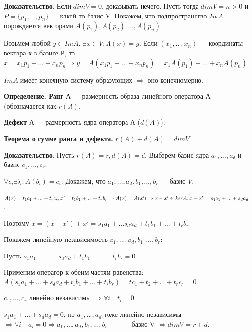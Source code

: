 \documentclass[a4paper]{article}
\begin{document}
    \begin{hproof}
        \textbf{Доказательство.} Если $dimV = 0$, доказывать нечего.
        Пусть тогда $dimV = n>0$ и $P = \{p_1, ..., p_n\}$ --- какой-то базис V. Покажем, что подпространство $ImA$ порождается векторами $A(p_1), A(p_2), ..., A(p_n)$

        Возьмём любой $y \in ImA$. $\exists x \in V: A(x) = y$. Если $(x_1, ..., x_n)$ --- координаты вектора $х$ в базисе $Р$, то $x = x_1p_1 + ... + x_np_n \Rightarrow y = A(x_1p_1 + ... + x_np_n) = x_1A(p_1) + ... + x_nA(p_n)$

        $ImA$ имеет конечную систему образующих $\Rightarrow$ оно конечномерно.
    \end{hproof}

    \textbf{Определение. Ранг} $А$ --- размерность образа линейного оператора $А$ (обозначается как $r(A)$.

    \textbf{Дефект} $А$ --- размерность ядра оператора А ($d(A)$).

    \begin{htheorem}
        \textbf{Теорема о сумме ранга и дефекта.} $r(A) + d(A) = dimV$
    \end{htheorem}

    \begin{hproof}
        \textbf{Доказательство.} Пусть $r(A) = r, d(A) = d$. Выберем базис ядра $a_1, ..., a_d$ и базис $c_1, ..., c_r$.

        $\forall c_i \exists b_i: A(b_i) = c_i$. Докажем, что $a_1, ..., a_d, b_1, ..., b_r$ --- базис $V$.

        $A(x) = t_1c_1 + ... + t_rc_r, x' = t_1b_1 + ... + t_rb_r\\ \Rightarrow A(x) = A(x') \Rightarrow x-x' \in kerA, x-x' = s_1a_1 + ... + s_da_d$.

        Поэтому $x=(x-x')+x' = s_1a_1 + ... s_da_d + t_1b_1 + ... + t_rb_r$

        Покажем линейную независимость $a_1, ..., a_d, b_1, ..., b_r$:

        Пусть $s_1a_1 + ... + s_da_d + t_1b_1 + ... +t_rb_r = 0$

        Применим оператор к обеим частям равенства: $A(s_1a_1 + ... + s_da_d + t_1b_1 + ... +t_rb_r) = tc_1 + t_2 + ... + t_rc_r = 0$

        $c_1, ..., c_r$ линейно независимы $\Rightarrow \forall i \quad  t_i = 0$

        $s_1a_1 + ... + s_da_d = 0$, но $a_1, ..., a_d$ тоже линейно независимы $\Rightarrow \forall i \quad  a_i = 0 \Rightarrow a_1, ..., a_d, b_1, ..., b_r ---$ базис V $\Rightarrow dimV = r+d$.
    \end{hproof}
\end{document}
